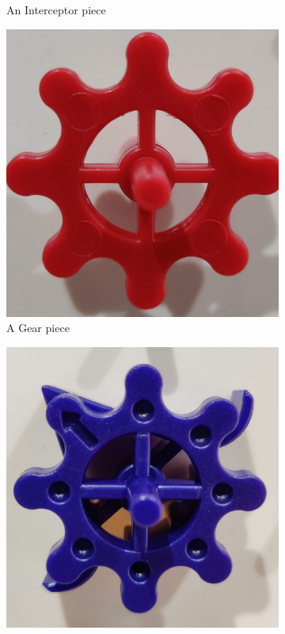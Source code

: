 \documentclass{l4proj}
\begin{document}
\begin{figure}
\begin{subfigure}[b]{0.20\textwidth}
        \caption{An Interceptor piece \\}
        \label{fig:phyInterceptor}
    \end{subfigure}
    \begin{subfigure}[b]{0.20\textwidth}
        \includegraphics[width=\textwidth]{images/gear.pdf}
        \caption{A Gear piece \\}
        \label{fig:phyGear}
    \end{subfigure}
    \begin{subfigure}[b]{0.20\textwidth}
        \includegraphics[width=\textwidth]{images/gearbit.pdf}

\end{subfigure}
\end{figure}
\end{document}
